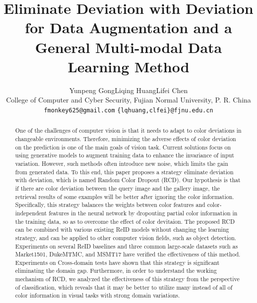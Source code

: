\documentclass[10pt,twocolumn,letterpaper]{article}
\begin{document}
\title{Eliminate Deviation with Deviation for Data Augmentation and a General Multi-modal Data Learning Method}

\newcommand*{\affaddr}[1]{#1} \newcommand*{\affmark}[1][*]{\textsuperscript{#1}}
\newcommand*{\email}[1]{\texttt{#1}}
\author{Yunpeng Gong\affmark[]\affmark[]\qquad Liqing Huang\affmark[]\qquad Lifei Chen\affmark[] \\
	\affaddr{\affmark[]College of Computer and Cyber Security, Fujian Normal University, P. R. China}\qquad
	\affaddr{\affmark[]}\\
	\email{\tt\small \affmark[]fmonkey625@gmail.com}\qquad
	\email{\tt\small \affmark[]\{lqhuang,clfei\}@fjnu.edu.cn}
}
\maketitle

\begin{abstract}
One of the challenges of computer vision is that it needs to adapt to color deviations in changeable environments. Therefore, minimizing the adverse effects of color deviation on the prediction is one of the main goals of vision task. Current solutions focus on using generative models to augment training data to enhance the invariance of input variation. However, such methods often introduce new noise, which limits the gain from generated data. To this end, this paper proposes a strategy eliminate deviation with deviation, which is named Random Color Dropout (RCD). Our hypothesis is that if there are color deviation between the query image and the gallery image, the retrieval results of some examples will be better after ignoring the color information. Specifically, this strategy balances the weights between color features and color-independent features in the neural network by dropouting partial color information in the training data, so as to overcome the effect of color devitaion. The proposed RCD can be combined with various existing ReID models without changing the learning strategy, and can be applied to other computer vision fields, such as object detection. Experiments on several ReID baselines and three common large-scale datasets such as Market1501, DukeMTMC, and MSMT17 have verified the effectiveness of this method. Experiments on Cross-domain tests have shown that this strategy is significant eliminating the domain gap. Furthermore, in order to understand the working mechanism of RCD, we analyzed the effectiveness of this strategy from the perspective of classification, which reveals that it may be better to utilize many instead of all of color information in visual tasks with strong domain variations.
\end{abstract}
\end{document}
